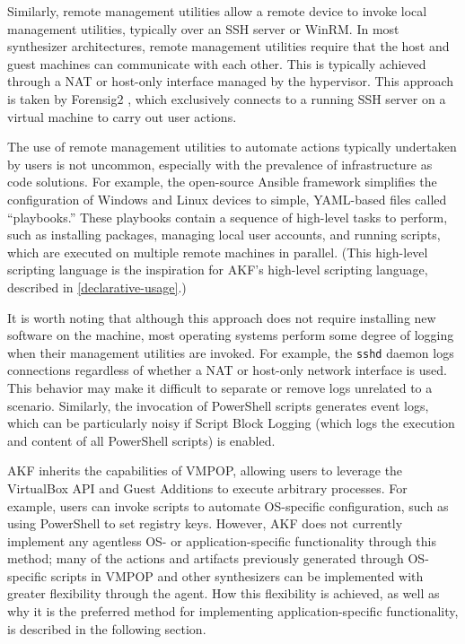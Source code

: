 \documentclass[letterpaper,12pt]{report}
\newcommand{\passthrough}[1]{#1}
\begin{document}
Similarly, remote management utilities allow a remote device to invoke
local management utilities, typically over an SSH server or WinRM. In
most synthesizer architectures, remote management utilities require that
the host and guest machines can communicate with each other. This is
typically achieved through a NAT or host-only interface managed by the
hypervisor. This approach is taken by Forensig2
\cite{mochForensicImageGenerator2009}, which exclusively connects to
a running SSH server on a virtual machine to carry out user actions.

The use of remote management utilities to automate actions typically
undertaken by users is not uncommon, especially with the prevalence of
infrastructure as code solutions. For example, the open-source Ansible
framework simplifies the configuration of Windows and Linux devices to
simple, YAML-based files called ``playbooks.'' These playbooks contain a
sequence of high-level tasks to perform, such as installing packages,
managing local user accounts, and running scripts, which are executed on
multiple remote machines in parallel. (This high-level scripting
language is the inspiration for AKF's high-level scripting language,
described in \autoref{declarative-usage}.)

It is worth noting that although this approach does not require
installing new software on the machine, most operating systems perform
some degree of logging when their management utilities are invoked. For
example, the \passthrough{\lstinline!sshd!} daemon logs connections
regardless of whether a NAT or host-only network interface is used. This
behavior may make it difficult to separate or remove logs unrelated to a
scenario. Similarly, the invocation of PowerShell scripts generates
event logs, which can be particularly noisy if Script Block Logging
(which logs the execution and content of all PowerShell scripts) is
enabled.

AKF inherits the capabilities of VMPOP, allowing users to leverage the
VirtualBox API and Guest Additions to execute arbitrary processes. For
example, users can invoke scripts to automate OS-specific configuration,
such as using PowerShell to set registry keys. However, AKF does not
currently implement any agentless OS- or application-specific
functionality through this method; many of the actions and artifacts
previously generated through OS-specific scripts in VMPOP
\cite{parkTREDEVMPOPCultivating2018} and other synthesizers can be
implemented with greater flexibility through the agent. How this
flexibility is achieved, as well as why it is the preferred method for
implementing application-specific functionality, is described in the
following section.
\end{document}
